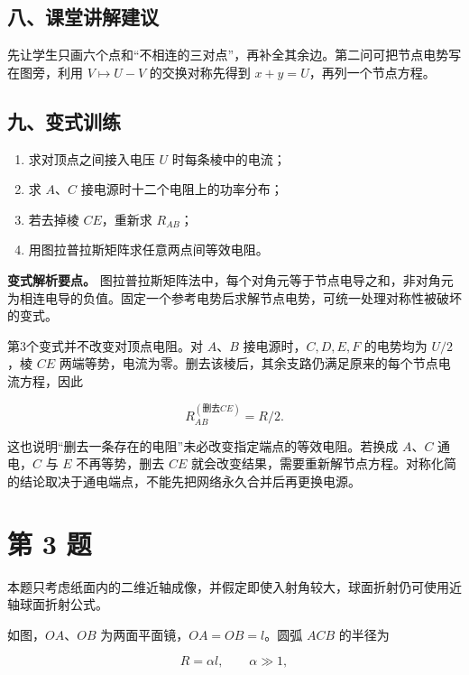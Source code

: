 \documentclass[12pt,a4paper,UTF8]{ctexart}
\newcommand{\tightlist}{\setlength{\itemsep}{0pt}\setlength{\parskip}{0pt}}
\begin{document}
\subsection{八、课堂讲解建议}\label{ux516bux8bfeux5802ux8bb2ux89e3ux5efaux8bae-1}

先让学生只画六个点和``不相连的三对点''，再补全其余边。第二问可把节点电势写在图旁，利用
\(V\mapsto U-V\) 的交换对称先得到 \(x+y=U\)，再列一个节点方程。

\subsection{九、变式训练}\label{ux4e5dux53d8ux5f0fux8badux7ec3-1}

\begin{enumerate}
\def\labelenumi{\arabic{enumi}.}
\tightlist
\item
  求对顶点之间接入电压 \(U\) 时每条棱中的电流；
\item
  求 \(A\)、\(C\) 接电源时十二个电阻上的功率分布；
\item
  若去掉棱 \(CE\)，重新求 \(R_{AB}\)；
\item
  用图拉普拉斯矩阵求任意两点间等效电阻。
\end{enumerate}

\textbf{变式解析要点。}
图拉普拉斯矩阵法中，每个对角元等于节点电导之和，非对角元为相连电导的负值。固定一个参考电势后求解节点电势，可统一处理对称性被破坏的变式。

第3个变式并不改变对顶点电阻。对 \(A\)、\(B\) 接电源时，\(C,D,E,F\)
的电势均为 \(U/2\)，棱 \(CE\)
两端等势，电流为零。删去该棱后，其余支路仍满足原来的每个节点电流方程，因此

\[R_{AB}^{(\text{删去}CE)}=R/2.\]

这也说明``删去一条存在的电阻''未必改变指定端点的等效电阻。若换成
\(A\)、\(C\) 通电，\(C\) 与 \(E\) 不再等势，删去 \(CE\)
就会改变结果，需要重新解节点方程。对称化简的结论取决于通电端点，不能先把网络永久合并后再更换电源。

\newpage

\section{第 3 题}\label{ux7b2c-3-ux9898}

本题只考虑纸面内的二维近轴成像，并假定即使入射角较大，球面折射仍可使用近轴球面折射公式。

如图，\(OA\)、\(OB\) 为两面平面镜，\(OA=OB=l\)。圆弧 \(ACB\) 的半径为

\[
R=\alpha l,\qquad \alpha\gg1,
\]
\end{document}
